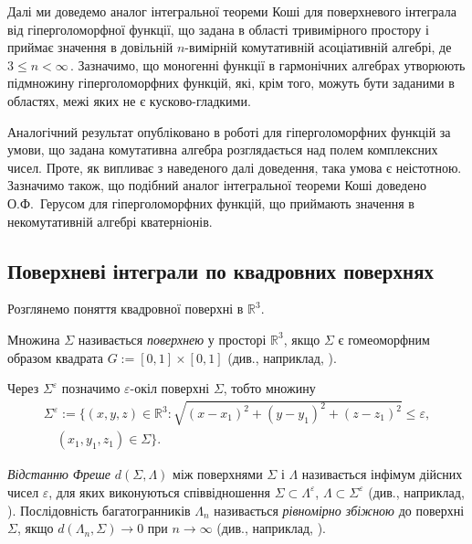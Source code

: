 \documentclass[11pt, reqno]{amsart}
\begin{document}
Далі ми доведемо аналог інтегральної теореми Коші для поверхневого інтеграла від гіперголоморфної
функції, що задана в області тривимірного простору і
приймає значення в довільній $n$-вимірній комутативній асоціативній алгебрі, де\, $3\leq n<\infty$\,. 
Зазначимо, що моногенні функції в гармонічних алгебрах утворюють підмножину гіперголоморфних функцій, які, крім того,
можуть бути заданими в областях, межі яких не є кусково-гладкими.

Аналогічний результат опубліковано в роботі \cite{Pla-Shp-CVEE-2014} для гіперголоморфних функцій за умови,
що задана комутативна алгебра розглядається над полем комплексних чисел. Проте, як випливає з наведеного далі доведення, 
така умова є неістотною. Зазначимо також, що подібний аналог інтегральної теореми Коші доведено 
О.Ф.~Герусом \cite{Gerus-2018} 
для гіперголоморфних функцій, що приймають значення в некомутативній алгебрі кватерніонів.





\subsection{Поверхневі інтеграли по  квадровних поверхнях}


Роз\-гля\-не\-мо поняття квадровної поверхні в $\mathbb{R}^{3}$.

Множина $\Sigma$ називається \textit{поверхнею} у просторі
$\mathbb{R}^{3}$, якщо $\Sigma$ є гомеоморфним образом квадрата
$G:=[0,1]\times [0,1]$ (див., наприклад, \cite[c.~24]{Rado}).

Через $\Sigma^\varepsilon$ позначимо
$\varepsilon$-окіл поверхні $\Sigma$, тобто
множину 
\begin{multline*}
\Sigma^\varepsilon:=\{(x,y,z)\in\mathbb{R}^3:
\sqrt{(x-x_1)^2+(y-y_1)^2+(z-z_1)^2}\leq\varepsilon,\\
 \quad (x_1,y_1,z_1)\in \Sigma\}.
\end{multline*} 

\textit{Відстанню Фреше} $d(\Sigma,\Lambda)$ між поверхнями $\Sigma$
і $\Lambda$ називається інфімум дійсних чисел $\varepsilon$, для
яких виконуються співвідношення $\Sigma\subset \Lambda^\varepsilon$,
$\Lambda\subset \Sigma^\varepsilon$ (див., наприклад,
\cite{Freshe}). Послідовність багатогранників  $\Lambda_n$
називається \textit{рівномірно збіжною} до поверхні $\Sigma$, якщо
$d(\Lambda_n,\Sigma)\rightarrow0$ при $n\rightarrow\infty$ (див.,
наприклад, \cite[c. 121]{Rado}).
\end{document}
